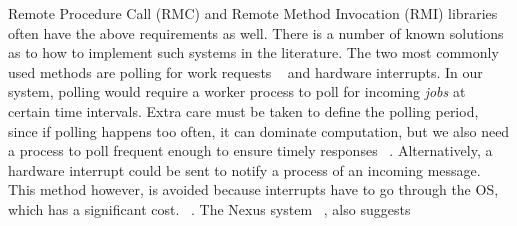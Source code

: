Remote Procedure Call (RMC) and Remote Method Invocation (RMI) libraries often have the above requirements as well.
There is a number of known solutions as to how to implement such systems in the literature.  The two most commonly used methods are polling for work requests
~\cite{Beckman96tulip:a, Saunders:2003:AAP:966049.781534, Foster96thenexus, vonEicken:1992:AMM:146628.140382} 
and hardware interrupts.
In our system, polling would require a worker process to poll for incoming \emph{jobs} at certain
time intervals.   Extra care must be taken to define the polling period, since if polling happens too often, it can
dominate computation, but we also need a process to poll frequent enough to ensure timely responses
~\cite{Saunders:2003:AAP:966049.781534, Shah:1998:PEL:876880.879642}.
Alternatively, a hardware interrupt could be sent to notify a process of an incoming message.  This method however,
is avoided because interrupts have to go through the OS, which has a significant cost. 
~\cite{Saunders:2003:AAP:966049.781534, Shah:1998:PEL:876880.879642, Foster96thenexus, vonEicken:1992:AMM:146628.140382}.
The Nexus system ~\cite{Foster96thenexus}, also suggests 

